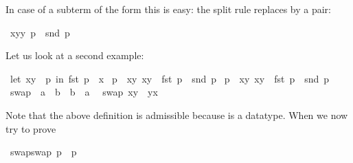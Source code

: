 \begin{isabellebody}
\begin{isamarkuptext}
In case of a subterm of the form  this is easy: the split
rule  replaces  by a pair:%
%
\end{isamarkuptext}%
\isamarkuptrue%
\ {\isachardoublequote}{\isacharparenleft}{\isasymlambda}{\isacharparenleft}x{\isacharcomma}y{\isacharparenright}{\isachardot}y{\isacharparenright}\ p\ {\isacharequal}\ snd\ p{\isachardoublequote}\isanewline
\isamarkupfalse%
\isamarkupfalse%
\isamarkuptrue%
\isanewline
\isamarkupfalse%
\isamarkupfalse%
\isamarkupfalse%
%
\begin{isamarkuptext}%
Let us look at a second example:%
\end{isamarkuptext}%
\isamarkuptrue%
\ {\isachardoublequote}let\ {\isacharparenleft}x{\isacharcomma}y{\isacharparenright}\ {\isacharequal}\ p\ in\ fst\ p\ {\isacharequal}\ x{\isachardoublequote}\isanewline
\isamarkupfalse%
\isamarkupfalse%
\isamarkuptrue%
\isamarkupfalse%
\ {\isachardoublequote}p\ {\isasymin}\ {\isacharbraceleft}{\isacharparenleft}x{\isacharcomma}y{\isacharparenright}{\isachardot}\ x{\isacharequal}y{\isacharbraceright}\ {\isasymlongrightarrow}\ fst\ p\ {\isacharequal}\ snd\ p{\isachardoublequote}\isanewline
\isamarkupfalse%
\isamarkupfalse%
\isamarkuptrue%
\isamarkupfalse%
\ {\isachardoublequote}p\ {\isasymin}\ {\isacharbraceleft}{\isacharparenleft}x{\isacharcomma}y{\isacharparenright}{\isachardot}\ x{\isacharequal}y{\isacharbraceright}\ {\isasymLongrightarrow}\ fst\ p\ {\isacharequal}\ snd\ p{\isachardoublequote}\isamarkupfalse%
\isamarkuptrue%
\isamarkupfalse%
\ swap\ {\isacharcolon}{\isacharcolon}\ {\isachardoublequote}{\isacharprime}a\ {\isasymtimes}\ {\isacharprime}b\ {\isasymRightarrow}\ {\isacharprime}b\ {\isasymtimes}\ {\isacharprime}a{\isachardoublequote}\isanewline
\isamarkupfalse%
\isanewline
\ \ {\isachardoublequote}swap\ {\isacharparenleft}x{\isacharcomma}y{\isacharparenright}\ {\isacharequal}\ {\isacharparenleft}y{\isacharcomma}x{\isacharparenright}{\isachardoublequote}\isamarkupfalse%
%
\begin{isamarkuptext}%
\noindent
Note that the above  definition is admissible
because \isa{{\isasymtimes}} is a datatype. When we now try to prove%
\end{isamarkuptext}%
\isamarkuptrue%
\ {\isachardoublequote}swap{\isacharparenleft}swap\ p{\isacharparenright}\ {\isacharequal}\ p{\isachardoublequote}\isamarkupfalse%
\isamarkuptrue%

\end{isabellebody}
